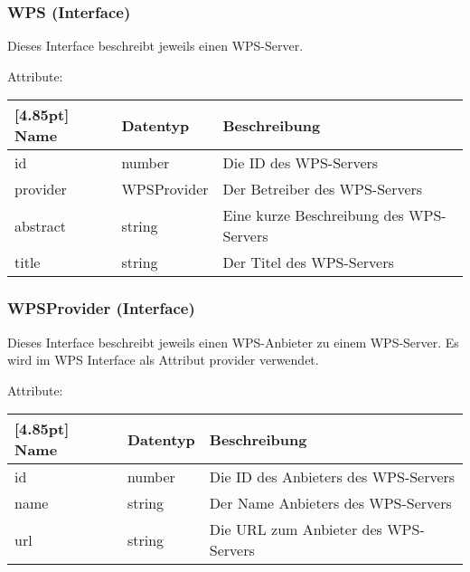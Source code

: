 			\subsubsection{WPS (Interface)}
			
			Dieses Interface beschreibt jeweils einen WPS-Server.\newline
			
			Attribute:
			\begin{center}
				\renewcommand{\arraystretch}{1.5}
				\setlength\tabcolsep{5pt}
				\begin{tabularx}{\textwidth}{|l|l|X|}
					\hline
					\rowcolor[gray]{0.75}[4.85pt]					
					Name & Datentyp & Beschreibung \\ \hline
					id & number & Die ID des WPS-Servers \\ \hline
					provider & WPSProvider & Der Betreiber des WPS-Servers \\ \hline
					abstract & string & Eine kurze Beschreibung des WPS-Servers \\ \hline
					title & string & Der Titel des WPS-Servers \\ \hline
				\end{tabularx}
			\end{center}
				
			\subsubsection{WPSProvider (Interface)}
			
			Dieses Interface beschreibt jeweils einen WPS-Anbieter zu einem WPS-Server. Es wird im WPS Interface als Attribut provider verwendet.\newline
			
			Attribute:
			\begin{center}
				\renewcommand{\arraystretch}{1.5}
				\setlength\tabcolsep{5pt}
				\begin{tabularx}{\textwidth}{|l|l|X|}
					\hline
					\rowcolor[gray]{0.75}[4.85pt]					
					Name & Datentyp & Beschreibung \\ \hline
					id & number & Die ID des Anbieters des WPS-Servers  \\ \hline
					name & string & Der Name Anbieters des WPS-Servers \\ \hline
					url & string & Die URL zum Anbieter des WPS-Servers \\ \hline
				\end{tabularx}
			\end{center}
				
